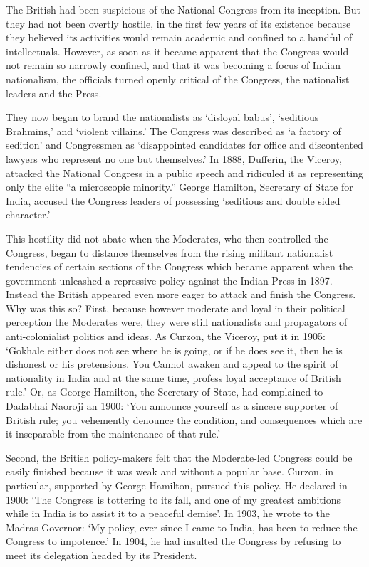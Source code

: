 The British had been suspicious of the National Congress from its inception. But they had not been overtly hostile, in the first few years of its existence because they believed its activities would remain academic and confined to a handful of intellectuals. However, as soon as it became apparent that the Congress would not remain so narrowly confined, and that it was becoming a focus of Indian nationalism, the officials turned openly critical of the Congress, the nationalist leaders and the Press.

They now began to brand the nationalists as `disloyal babus', `seditious Brahmins,' and `violent villains.' The Congress was described as `a factory of sedition' and Congressmen as `disappointed candidates for office and discontented lawyers who represent no one but themselves.' In 1888, Dufferin, the Viceroy, attacked the National Congress in a public speech and ridiculed it as representing only the elite ``a microscopic minority.'' George Hamilton, Secretary of State for India, accused the Congress leaders of possessing `seditious and double sided character.'

This hostility did not abate when the Moderates, who then controlled the Congress, began to distance themselves from the rising militant nationalist tendencies of certain sections of the Congress which became apparent when the government unleashed a repressive policy against the Indian Press in 1897. Instead the British appeared even more eager to attack and finish the Congress. Why was this so? First, because however moderate and loyal in their political perception the Moderates were, they were still nationalists and propagators of anti-colonialist politics and ideas. As Curzon, the Viceroy, put it in 1905: `Gokhale either does not see where he is going, or if he does see it, then he is dishonest or his pretensions. You Cannot awaken and appeal to the spirit of nationality in India and at the same time, profess loyal acceptance of British rule.' Or, as George Hamilton, the Secretary of State, had complained to Dadabhai Naoroji an 1900: `You announce yourself as a sincere supporter of British rule; you vehemently denounce the condition, and consequences which are it inseparable from the maintenance of that rule.'

Second, the British policy-makers felt that the Moderate-led Congress could be easily finished because it was weak and without a popular base. Curzon, in particular, supported by George Hamilton, pursued this policy. He declared in 1900: `The Congress is tottering to its fall, and one of my greatest ambitions while in India is to assist it to a peaceful demise'. In 1903, he wrote to the Madras Governor: `My policy, ever since I came to India, has been to reduce the Congress to impotence.' In 1904, he had insulted the Congress by refusing to meet its delegation headed by its President.

